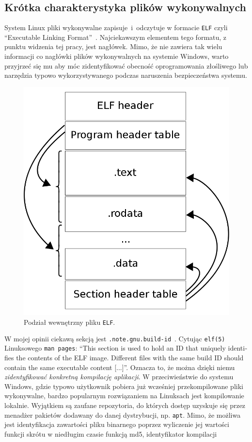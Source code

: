 \subsection{Krótka charakterystyka plików wykonywalnych}
\label{sec:elfini}
System Linux pliki wykonywalne zapisuje~i~odczytuje w formacie \texttt{ELF} czyli 
\foreignquote{english}{Executable Linking Format}~\cite{linux_foundation_tool_nodate}.
Najciekawszym elementem tego formatu, z punktu widzenia tej pracy, jest nagłówek. Mimo, że nie zawiera tak wielu informacji co
nagłówki plików wykonywalnych na systemie Windows, warto przyjrzeć się mu aby móc zidentyfikować obecność
oprogramowania złośliwego lub narzędzia typowo wykorzystywanego podczas naruszenia bezpieczeństwa systemu.
\begin{figure}[H]
    \centering
    \includegraphics[width=0.45\linewidth]{rysunki/elf.png}
    \caption{Podział wewnętrzny pliku \texttt{ELF}\protect\footnotemark.}
    \label{fig:enter-label}
\end{figure}
W mojej opinii ciekawą sekcją jest \texttt{.note.gnu.build-id}~\cite{elfman}. Cytując
\texttt{elf(5)} Linuksowego \texttt{man pages}: \foreignquote{english}{This section is used to hold an ID that uniquely
identifies the contents of the ELF image.  Different files
with the same build ID should contain the same executable
content [...]}. Oznacza to, że można dzięki niemu \emph{zidentyfikować konkretną kompilację aplikacji}.
W przeciwieństwie do systemu Windows, gdzie typowo użytkownik pobiera już wcześniej przekompilowane pliki wykonywalne,
bardzo popularnym rozwiązaniem na Linuksach jest kompilowanie lokalnie. Wyjątkiem są zaufane repozytoria, do których dostęp
uzyskuje się przez menadżer pakietów dodawany do danej dystrybucji, np. \texttt{apt}. Mimo, że możliwa jest identyfikacja 
zawartości pliku binarnego poprzez wyliczenie jej wartości funkcji skrótu w niedługim czasie funkcją md5, identyfikator kompilacji
